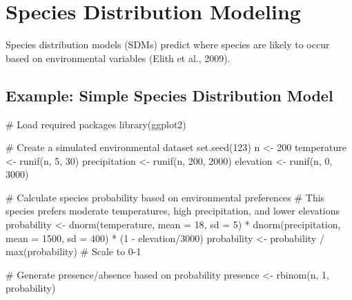 \documentclass[
  letterpaper,
]{book}
\newenvironment{Shaded}{\begin{snugshade}}{\end{snugshade}}
\newcommand{\AttributeTok}[1]{\textcolor[rgb]{0.40,0.45,0.13}{#1}}
\newcommand{\CommentTok}[1]{\textcolor[rgb]{0.37,0.37,0.37}{#1}}
\newcommand{\DecValTok}[1]{\textcolor[rgb]{0.68,0.00,0.00}{#1}}
\newcommand{\FunctionTok}[1]{\textcolor[rgb]{0.28,0.35,0.67}{#1}}
\newcommand{\NormalTok}[1]{\textcolor[rgb]{0.00,0.23,0.31}{#1}}
\newcommand{\OtherTok}[1]{\textcolor[rgb]{0.00,0.23,0.31}{#1}}
\newcommand{\SpecialCharTok}[1]{\textcolor[rgb]{0.37,0.37,0.37}{#1}}
\begin{document}
\section{Species Distribution
Modeling}\label{species-distribution-modeling}

Species distribution models (SDMs) predict where species are likely to
occur based on environmental variables (Elith et al., 2009).

\subsection{Example: Simple Species Distribution
Model}\label{example-simple-species-distribution-model}

\begin{Shaded}
\begin{Highlighting}[]
\CommentTok{\# Load required packages}
\FunctionTok{library}\NormalTok{(ggplot2)}

\CommentTok{\# Create a simulated environmental dataset}
\FunctionTok{set.seed}\NormalTok{(}\DecValTok{123}\NormalTok{)}
\NormalTok{n }\OtherTok{\textless{}{-}} \DecValTok{200}
\NormalTok{temperature }\OtherTok{\textless{}{-}} \FunctionTok{runif}\NormalTok{(n, }\DecValTok{5}\NormalTok{, }\DecValTok{30}\NormalTok{)}
\NormalTok{precipitation }\OtherTok{\textless{}{-}} \FunctionTok{runif}\NormalTok{(n, }\DecValTok{200}\NormalTok{, }\DecValTok{2000}\NormalTok{)}
\NormalTok{elevation }\OtherTok{\textless{}{-}} \FunctionTok{runif}\NormalTok{(n, }\DecValTok{0}\NormalTok{, }\DecValTok{3000}\NormalTok{)}

\CommentTok{\# Calculate species probability based on environmental preferences}
\CommentTok{\# This species prefers moderate temperatures, high precipitation, and lower elevations}
\NormalTok{probability }\OtherTok{\textless{}{-}} \FunctionTok{dnorm}\NormalTok{(temperature, }\AttributeTok{mean =} \DecValTok{18}\NormalTok{, }\AttributeTok{sd =} \DecValTok{5}\NormalTok{) }\SpecialCharTok{*} 
               \FunctionTok{dnorm}\NormalTok{(precipitation, }\AttributeTok{mean =} \DecValTok{1500}\NormalTok{, }\AttributeTok{sd =} \DecValTok{400}\NormalTok{) }\SpecialCharTok{*} 
\NormalTok{               (}\DecValTok{1} \SpecialCharTok{{-}}\NormalTok{ elevation}\SpecialCharTok{/}\DecValTok{3000}\NormalTok{)}
\NormalTok{probability }\OtherTok{\textless{}{-}}\NormalTok{ probability }\SpecialCharTok{/} \FunctionTok{max}\NormalTok{(probability)  }\CommentTok{\# Scale to 0{-}1}

\CommentTok{\# Generate presence/absence based on probability}
\NormalTok{presence }\OtherTok{\textless{}{-}} \FunctionTok{rbinom}\NormalTok{(n, }\DecValTok{1}\NormalTok{, probability)}


\end{Highlighting}
\end{Shaded}
\end{document}
